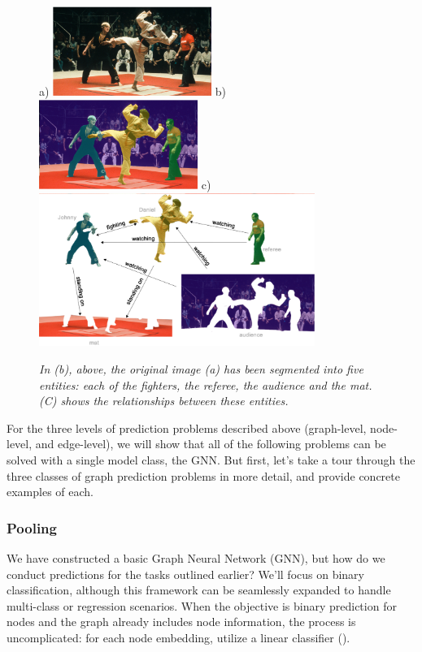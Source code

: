 \documentclass[binding=0.6cm]{sapthesis}
\newcommand{\mycite}[1]{(\cite{#1})}
\begin{document}
\begin{figure}
    \centering
    \footnotesize a) \includegraphics[width=0.46\textwidth]{imgs/background/scene-under-01.png}
    \footnotesize b) \includegraphics[width=0.46\textwidth]{imgs/background/scene-under-02.png}
    \footnotesize c) \includegraphics[width=0.8\textwidth]{imgs/background/scene-under-03.png}
    \caption{\textit{In (b), above, the original image (a) has been segmented into five entities: each of the fighters, the referee, the audience and the mat. (C) shows the relationships between these entities.}}
    \label{fig:bg.gnn.scene-under}
\end{figure}

For the three levels of prediction problems described above (graph-level, node-level, and edge-level), we will show that all of the following problems can be solved with a single model class, the GNN. But first, let’s take a tour through the three classes of graph prediction problems in more detail, and provide concrete examples of each.


\subsubsection{Pooling}
\label{sec:bg.gnn.graph-pooling}
We have constructed a basic Graph Neural Network (GNN), but how do we conduct predictions for the tasks outlined earlier? We'll focus on binary classification, although this framework can be seamlessly expanded to handle multi-class or regression scenarios. When the objective is binary prediction for nodes and the graph already includes node information, the process is uncomplicated: for each node embedding, utilize a linear classifier \mycite{daigavane2021-conv-on-graphs}. 
\end{document}
